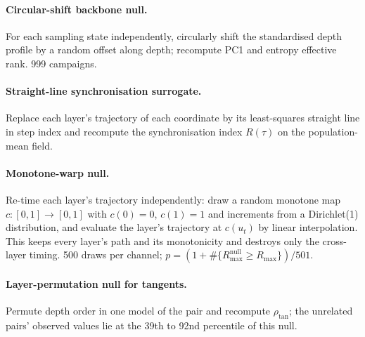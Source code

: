 \documentclass[11pt]{article}
\theoremstyle{definition}
\begin{document}
\paragraph{Circular-shift backbone null.} For each sampling state independently, circularly shift the standardised depth profile by a random offset along depth; recompute PC1 and entropy effective rank. 999 campaigns.
\paragraph{Straight-line synchronisation surrogate.} Replace each layer's trajectory of each coordinate by its least-squares straight line in step index and recompute the synchronisation index $R(\tau)$ on the population-mean field.
\paragraph{Monotone-warp null.} Re-time each layer's trajectory independently: draw a random monotone map $c:[0,1]\to[0,1]$ with $c(0)=0$, $c(1)=1$ and increments from a Dirichlet(1) distribution, and evaluate the layer's trajectory at $c(u_t)$ by linear interpolation. This keeps every layer's path and its monotonicity and destroys only the cross-layer timing. 500 draws per channel; $p=(1+\#\{R^{\mathrm{null}}_{\max}\ge R_{\max}\})/501$.
\paragraph{Layer-permutation null for tangents.} Permute depth order in one model of the pair and recompute $\rho_{\mathrm{tan}}$; the unrelated pairs' observed values lie at the 39th to 92nd percentile of this null.
\end{document}
